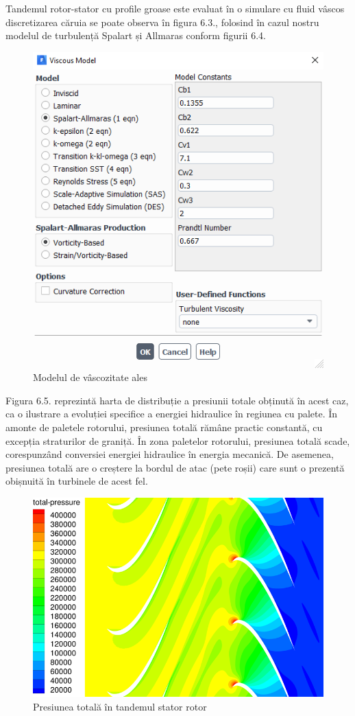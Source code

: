 Tandemul rotor-stator cu profile groase este evaluat în o simulare cu fluid vâscos discretizarea căruia se poate observa în figura 6.3., folosind în cazul nostru modelul de turbulență Spalart și Allmaras \cite{spalart1992one} conform figurii 6.4.

\begin{figure}
	\centering
	\includegraphics[scale=0.7]{figures/tandem_thick_viscous_model.PNG}
	\caption{Modelul de vâscozitate ales}
	\label{Modelul de vâscozitate ales}
\end{figure}

Figura 6.5. reprezintă harta de distribuție a presiunii totale obținută în acest caz, ca o ilustrare a evoluției specifice a energiei hidraulice în regiunea cu palete. În amonte de paletele rotorului, presiunea totală rămâne practic constantă, cu excepția straturilor de graniță. În zona paletelor rotorului, presiunea totală scade, corespunzând conversiei energiei hidraulice în energia mecanică. De asemenea, presiunea totală are o creștere la bordul de atac (pete roșii) care sunt o prezentă obișnuită în turbinele de acest fel.

\begin{figure}
	\centering
	\includegraphics[scale=1]{figures/presiunea-totala.png}
	\caption{Presiunea totală în tandemul stator rotor}
	\label{Presiunea totală în tandemul stator rotor}
\end{figure}